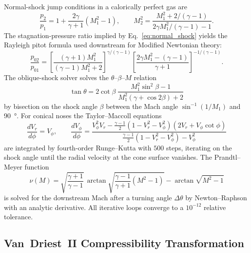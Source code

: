 Normal-shock jump conditions in a calorically perfect gas are
%
\begin{equation}
\frac{p_2}{p_1} = 1 + \frac{2\gamma}{\gamma + 1}\left(M_1^2 - 1\right),
\qquad
M_2^2 = \frac{M_1^2 + 2/(\gamma - 1)}
            {2\gamma M_1^2/(\gamma - 1) - 1}.
\label{eq:normal_shock}
\end{equation}
%
The stagnation-pressure ratio implied by Eq.~\eqref{eq:normal_shock} yields the
Rayleigh pitot formula used downstream for Modified Newtonian theory:
%
\begin{equation}
\frac{p_{02}}{p_{01}} =
  \left[\frac{(\gamma+1)M_1^2}{(\gamma-1)M_1^2 + 2}\right]^{\gamma/(\gamma-1)}
  \left[\frac{2\gamma M_1^2 - (\gamma - 1)}{\gamma + 1}\right]^{-1/(\gamma-1)}.
\label{eq:rayleigh_pitot}
\end{equation}
%
The oblique-shock solver solves the $\theta$--$\beta$--$M$ relation
%
\begin{equation}
\tan\theta = 2\cot\beta\;
  \frac{M_1^2 \sin^2\beta - 1}{M_1^2(\gamma + \cos 2\beta) + 2}
\label{eq:theta_beta_m}
\end{equation}
%
by bisection on the shock angle $\beta$ between the Mach angle
$\sin^{-1}(1/M_1)$ and \SI{90}{\degree}. For conical noses the Taylor--Maccoll
equations~\cite{taylormaccoll1933}
%
\begin{equation}
\frac{dV_r}{d\phi} = V_\phi, \qquad
\frac{dV_\phi}{d\phi} =
  \frac{V_\phi^2 V_r - \tfrac{\gamma - 1}{2}
        \left(1 - V_r^2 - V_\phi^2\right)\left(2V_r + V_\phi\cot\phi\right)}
       {\tfrac{\gamma - 1}{2}\left(1 - V_r^2 - V_\phi^2\right) - V_\phi^2}
\label{eq:taylor_maccoll}
\end{equation}
%
are integrated by fourth-order Runge--Kutta with $500$ steps, iterating on the
shock angle until the radial velocity at the cone surface vanishes. The
Prandtl--Meyer function
%
\begin{equation}
\nu(M) = \sqrt{\frac{\gamma + 1}{\gamma - 1}}\,
  \arctan\!\sqrt{\frac{\gamma - 1}{\gamma + 1}\left(M^2 - 1\right)}
  - \arctan\!\sqrt{M^2 - 1}
\label{eq:prandtl_meyer}
\end{equation}
%
is solved for the downstream Mach after a turning angle $\Delta\theta$ by
Newton--Raphson with an analytic derivative. All iterative loops converge to a
$10^{-12}$ relative tolerance.

\subsection{Van~Driest~II Compressibility Transformation}
\label{subsec:vandriest}

